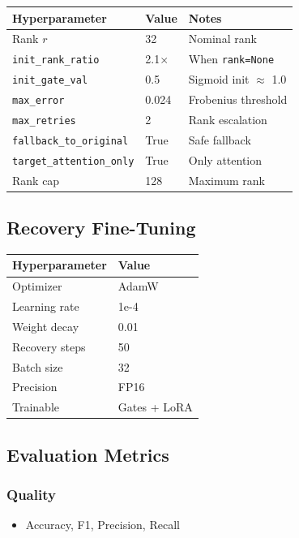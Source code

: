 \begin{table}[H]
\centering
\small
\begin{tabular}{lll}
\toprule
\textbf{Hyperparameter} & \textbf{Value} & \textbf{Notes} \\
\midrule
Rank $r$ & 32 & Nominal rank \\
\texttt{init\_rank\_ratio} & 2.1$\times$ & When \texttt{rank=None} \\
\texttt{init\_gate\_val} & 0.5 & Sigmoid init $\approx$ 1.0 \\
\texttt{max\_error} & 0.024 & Frobenius threshold \\
\texttt{max\_retries} & 2 & Rank escalation \\
\texttt{fallback\_to\_original} & True & Safe fallback \\
\texttt{target\_attention\_only} & True & Only attention \\
Rank cap & 128 & Maximum rank \\
\bottomrule
\end{tabular}
\end{table}

\subsection{Recovery Fine-Tuning}

\begin{table}[H]
\centering
\small
\begin{tabular}{ll}
\toprule
\textbf{Hyperparameter} & \textbf{Value} \\
\midrule
Optimizer & AdamW \\
Learning rate & 1e-4 \\
Weight decay & 0.01 \\
Recovery steps & 50 \\
Batch size & 32 \\
Precision & FP16 \\
Trainable & Gates + LoRA \\
\bottomrule
\end{tabular}
\end{table}

\subsection{Evaluation Metrics}

\subsubsection{Quality}
\begin{itemize}
\item Accuracy, F1, Precision, Recall

\end{itemize}
